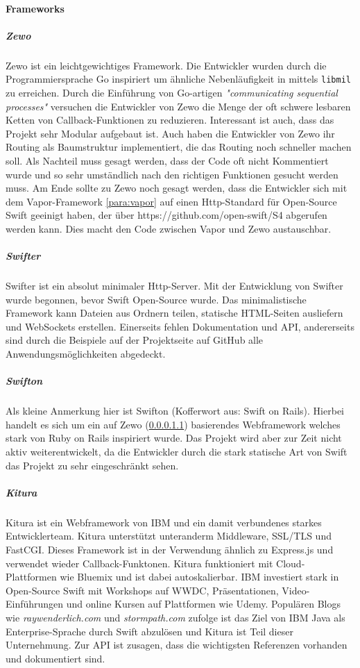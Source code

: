 \paragraph{Frameworks}
\label{para:frameworks}
\subparagraph{Zewo}
\label{para:zewo}
Zewo ist ein leichtgewichtiges Framework. Die Entwickler wurden durch die Programmiersprache Go inspiriert um ähnliche Nebenläufigkeit in mittels \lstinline{libmil}  zu erreichen. Durch die Einführung von Go-artigen \textit{"communicating sequential processes"} versuchen die Entwickler von Zewo die Menge der oft schwere lesbaren Ketten von Callback-Funktionen zu reduzieren. Interessant ist auch, dass das Projekt sehr Modular aufgebaut ist.  Auch haben die Entwickler von Zewo ihr Routing als Baumstruktur implementiert, die das Routing noch schneller machen soll. Als Nachteil muss gesagt werden, dass der Code oft nicht Kommentiert wurde und so sehr umständlich nach den richtigen Funktionen gesucht werden muss. Am Ende sollte zu Zewo noch gesagt werden, dass die Entwickler sich mit dem Vapor-Framework \ref{para:vapor} auf einen Http-Standard für Open-Source Swift geeinigt haben, der über https://github.com/open-swift/S4 abgerufen werden kann\parencite{openswifthttp}. Dies macht den Code zwischen Vapor und Zewo austauschbar. 
\subparagraph{Swifter}
\label{para:swifter}
Swifter ist ein absolut minimaler Http-Server. Mit der Entwicklung von Swifter wurde begonnen, bevor Swift Open-Source wurde. Das minimalistische Framework kann Dateien aus Ordnern teilen, statische HTML-Seiten ausliefern und WebSockets erstellen. Einerseits fehlen Dokumentation und API, andererseits sind durch die Beispiele auf der Projektseite auf GitHub alle Anwendungsmöglichkeiten abgedeckt. 
\subparagraph{Swifton}
\label{para:swifton}
Als kleine Anmerkung hier ist Swifton (Kofferwort aus: Swift on Rails). Hierbei handelt es sich um ein auf Zewo (\ref{para:zewo}) basierendes Webframework welches stark von Ruby on Rails inspiriert wurde. Das Projekt wird aber zur Zeit nicht aktiv weiterentwickelt, da die Entwickler durch die stark statische Art von Swift das Projekt zu sehr eingeschränkt sehen\parencite{swifton}.
\subparagraph{Kitura}
\label{para:kitura}
Kitura ist ein Webframework von IBM und ein damit verbundenes starkes Entwicklerteam. Kitura unterstützt unteranderm Middleware, SSL/TLS und FastCGI. Dieses Framework ist in der Verwendung ähnlich zu Express.js und verwendet wieder Callback-Funktonen. Kitura funktioniert mit Cloud-Plattformen wie Bluemix und ist dabei autoskalierbar. IBM investiert stark in Open-Source Swift mit Workshops auf WWDC\parencite{WWDC}, Präsentationen, Video-Einführungen\parencite{ibmdemo} und online Kursen auf Plattformen wie Udemy\parencite{udemyswift}. Populären Blogs wie \textit{raywenderlich.com} und \textit{stormpath.com}  zufolge ist das Ziel von IBM Java als Enterprise-Sprache durch Swift abzulösen und Kitura ist Teil dieser Unternehmung.\parencite{rayenterprise}\parencite{stormswiftserver} Zur API ist zusagen, dass die wichtigsten Referenzen vorhanden und dokumentiert sind.
